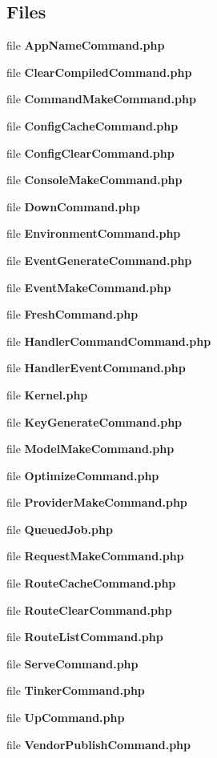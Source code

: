 \subsection*{Files}
\begin{DoxyCompactItemize}
\item 
file {\bf App\+Name\+Command.\+php}
\item 
file {\bf Clear\+Compiled\+Command.\+php}
\item 
file {\bf Command\+Make\+Command.\+php}
\item 
file {\bf Config\+Cache\+Command.\+php}
\item 
file {\bf Config\+Clear\+Command.\+php}
\item 
file {\bf Console\+Make\+Command.\+php}
\item 
file {\bf Down\+Command.\+php}
\item 
file {\bf Environment\+Command.\+php}
\item 
file {\bf Event\+Generate\+Command.\+php}
\item 
file {\bf Event\+Make\+Command.\+php}
\item 
file {\bf Fresh\+Command.\+php}
\item 
file {\bf Handler\+Command\+Command.\+php}
\item 
file {\bf Handler\+Event\+Command.\+php}
\item 
file {\bf Kernel.\+php}
\item 
file {\bf Key\+Generate\+Command.\+php}
\item 
file {\bf Model\+Make\+Command.\+php}
\item 
file {\bf Optimize\+Command.\+php}
\item 
file {\bf Provider\+Make\+Command.\+php}
\item 
file {\bf Queued\+Job.\+php}
\item 
file {\bf Request\+Make\+Command.\+php}
\item 
file {\bf Route\+Cache\+Command.\+php}
\item 
file {\bf Route\+Clear\+Command.\+php}
\item 
file {\bf Route\+List\+Command.\+php}
\item 
file {\bf Serve\+Command.\+php}
\item 
file {\bf Tinker\+Command.\+php}
\item 
file {\bf Up\+Command.\+php}
\item 
file {\bf Vendor\+Publish\+Command.\+php}
\end{DoxyCompactItemize}
